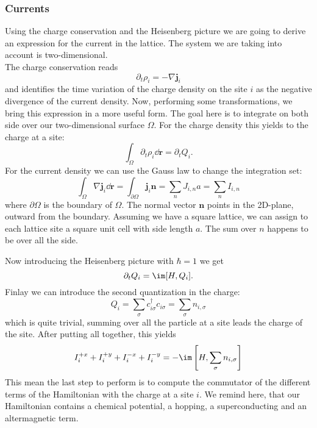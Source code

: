 \documentclass[../main.tex]{subfile}
\begin{document}
\subsubsection{Currents}
Using the charge conservation and the Heisenberg picture we are going to derive an expression
for the current in the lattice. The system we are taking into account is two-dimensional.\\

The charge conservation reads
\[
    \partial_t \rho_i = - \nabla \bm{j}_i
\]
and identifies the time variation of the charge density on the site $i$ as the negative divergence of the current density.
Now, performing some transformations, we bring this expression in a more useful form. The goal here is to integrate on both 
side over our two-dimensional surface $\Omega$. For the charge density this yields to the charge at a site:
\[
    \int_{\Omega} \partial_t \rho_i \dd \bm{r} = \partial_t Q_i .
\]
For the current density we can use the Gauss law to change the integration set:
\[
    \int_{\Omega} \nabla \bm{j}_i \dd \bm{r} = \int_{\partial \Omega} \bm{j}_i \bm{n} = \sum_{n} J_{i,n} a = \sum_{n} I_{i,n}
\]
where $\partial \Omega$ is the boundary of $\Omega$. The normal vector $\bm{n}$ points in the 2D-plane, outward from the boundary.
Assuming we have a square lattice, we can assign to each lattice site a square
unit cell with side length $a$. The sum over $n$ happens to be over all the side.

Now introducing the Heisenberg picture with $\hbar = 1$ we get
\[
    \partial_t Q_i = \im [H, Q_i].
\]
Finlay we can introduce the second quantization in the charge:
\[
    Q_i = \sum_{\sigma} c_{i\sigma}^{\dagger}  c_{i\sigma} = \sum_{\sigma} n_{i,\sigma}
\]
which is quite trivial, summing over all the particle at a site leads the charge of the site. After putting all together, this yields
\begin{equation}\label{eq:CurrentSidesCommutator}
 I_{i}^{+x} +  I_{i}^{+y} +  I_{i}^{-x} +  I_{i}^{-y} = -\im \left[H, \sum_{\sigma} n_{i,\sigma}\right]
\end{equation}
This mean the last step to perform is to compute the commutator of the different terms of the Hamiltonian with the charge at a site $i$.
We remind here, that our Hamiltonian contains a chemical potential, a hopping, a superconducting and an altermagnetic term.
\end{document}
